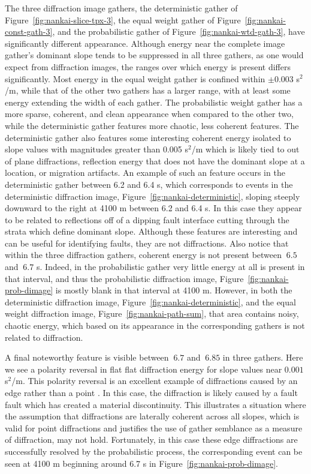 The three diffraction image gathers, the deterministic gather of Figure~\ref{fig:nankai-slice-tpx-3}, the equal weight gather of Figure~\ref{fig:nankai-const-gath-3}, and the probabilistic gather of Figure~\ref{fig:nankai-wtd-gath-3}, have significantly different appearance.  Although energy near the complete image gather's dominant slope tends to be suppressed in all three gathers, as one would expect from diffraction images, the ranges over which energy is present differs significantly.  Most energy in the equal weight gather is confined within $\pm 0.003$ s$^2$/m, while that of the other two gathers has a larger range, with at least some energy extending the width of each gather.  The probabilistic weight gather has a more sparse, coherent, and clean appearance when compared to the other two, while the deterministic gather features more chaotic, less coherent features.  The deterministic gather also features some interesting coherent energy isolated to slope values with magnitudes greater than  0.005 s$^2$/m which is likely tied to out of plane diffractions,  reflection energy that does not have the dominant slope at a location, or migration artifacts.  An example of such an feature occurs in the deterministic gather between 6.2 and 6.4 s, which corresponds to events in the deterministic diffraction image, Figure~\ref{fig:nankai-deterministic}, sloping steeply downward to the right at 4100 m between 6.2 and 6.4 s.  In this case they appear to be related to reflections off of a dipping fault interface cutting through the strata which define dominant slope.  Although these features are interesting and can be useful for identifying faults, they are not diffractions.  Also notice that within the three diffraction gathers, coherent energy is not present between $~6.5$ and $~6.7$ s.  Indeed, in the probabilistic gather very little energy at all is present in that interval, and thus the probabilistic diffraction image, Figure~\ref{fig:nankai-prob-dimage} is mostly blank in that interval at 4100 m.  However, in both the deterministic diffraction image, Figure~\ref{fig:nankai-deterministic}, and the equal weight diffraction image, Figure~\ref{fig:nankai-path-sum}, that area contains noisy, chaotic energy, which based on its appearance in the corresponding gathers is not related to diffraction.  

A final noteworthy feature is visible between $~6.7$ and $~6.85$ in three gathers. Here we see a polarity reversal in flat flat diffraction energy for slope values near $0.001$ s$^2$/m.  This polarity reversal is an excellent example of diffractions caused by an edge rather than a point \cite[]{edgetip}.  In this case, the diffraction is likely caused by a fault fault which has created a material discontinuity.  This illustrates a situation where the assumption that diffractions are laterally coherent across all slopes, which is valid for point diffractions and justifies the use of gather semblance as a measure of diffraction, may not hold.  Fortunately, in this case these edge diffractions are successfully resolved by the probabilistic process, the corresponding event can be seen at 4100 m beginning around 6.7 s in Figure~\ref{fig:nankai-prob-dimage}.



